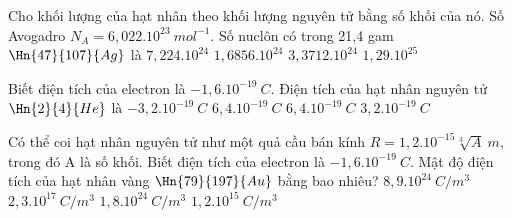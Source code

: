 \begin{vidu}%
	Cho khối lượng của hạt nhân theo khối lượng nguyên tử bằng số khối của nó. Số Avogadro $N_A=6,022.10^{23}\ mol^{-1}$. Số nuclôn có trong 21,4 gam $\Hn{47}{107}{Ag}$ là
	\choice
	{$7,224.10^{24}$}
	{$1,6856.10^{24}$}
	{$3,3712.10^{24}$}
	{\True $1,29.10^{25}$}
\end{vidu}
\begin{vidu}%
	Biết điện tích của electron là $ - 1,{6.10^{- 19}}\ C$. Điện tích của hạt nhân nguyên tử $\Hn{2}{4}{He}$ là
	\choice
	{$ - 3,2.10^{- 19}\ C$}
	{$6,4.10^{- 19}\ C$}
	{$6,4.10^{- 19}\ C$}
	{\True $3,2.10^{- 19}\ C$}
\end{vidu}
\begin{vidu*}%
	Có thể coi hạt nhân nguyên tử như một quả cầu bán kính $R = 1,2.10^{- 15}\sqrt[3]{A}\ m$, trong đó A là số khối. Biết điện tích của electron là $ - 1,6.10^{- 19}\ C$. Mật độ điện tích của hạt nhân vàng $\Hn{79}{197}{Au}$ bằng bao nhiêu?
	\choice
	{\True $8,9.1{0^{24}}\ C/{m^3}$}
	{$2,3.10^{17}\ C/{m^3}$}
	{$1,8.10^{24}\ C/{m^3}$}
	{$1,2.10^{15}\ C/{m^3}$}
\end{vidu*}